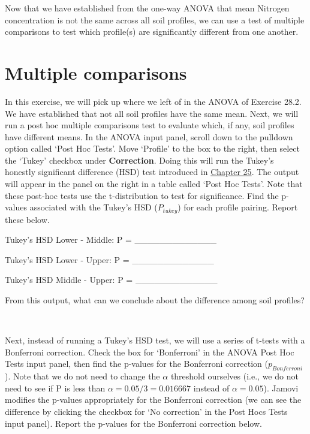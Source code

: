 \documentclass[
  openany]{krantz}
\begin{document}
Now that we have established from the one-way ANOVA that mean Nitrogen concentration is not the same across all soil profiles, we can use a test of multiple comparisons to test which profile(s) are significantly different from one another.

\hypertarget{multiple-comparisons}{%
\section{Multiple comparisons}\label{multiple-comparisons}}

In this exercise, we will pick up where we left of in the ANOVA of Exercise 28.2.
We have established that not all soil profiles have the same mean.
Next, we will run a post hoc multiple comparisons test to evaluate which, if any, soil profiles have different means.
In the ANOVA input panel, scroll down to the pulldown option called `Post Hoc Tests'.
Move `Profile' to the box to the right, then select the `Tukey' checkbox under \textbf{Correction}.
Doing this will run the Tukey's honestly significant difference (HSD) test introduced in \protect\hyperlink{Chapter_25}{Chapter 25}.
The output will appear in the panel on the right in a table called `Post Hoc Tests'.
Note that these post-hoc tests use the t-distribution to test for significance.
Find the p-values associated with the Tukey's HSD (\(P_{tukey}\)) for each profile pairing.
Report these below.

Tukey's HSD Lower - Middle: P = \_\_\_\_\_\_\_\_\_\_\_\_\_

Tukey's HSD Lower - Upper: P = \_\_\_\_\_\_\_\_\_\_\_\_\_

Tukey's HSD Middle - Upper: P = \_\_\_\_\_\_\_\_\_\_\_\_\_

From this output, what can we conclude about the difference among soil profiles?

\begin{verbatim}


\end{verbatim}

Next, instead of running a Tukey's HSD test, we will use a series of t-tests with a Bonferroni correction.
Check the box for `Bonferroni' in the ANOVA Post Hoc Tests input panel, then find the p-values for the Bonferroni correction (\(p_{Bonferroni}\)).
Note that we do not need to change the \(\alpha\) threshold ourselves (i.e., we do not need to see if P is less than \(\alpha = 0.05/3 = 0.016667\) instead of \(\alpha = 0.05\)).
Jamovi modifies the p-values appropriately for the Bonferroni correction (we can see the difference by clicking the checkbox for `No correction' in the Post Hocs Tests input panel).
Report the p-values for the Bonferroni correction below.
\end{document}
